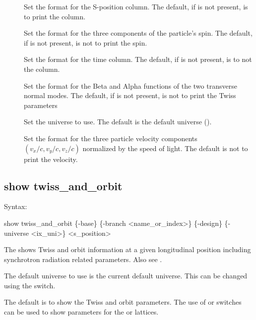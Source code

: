 {{{{{{{{{\begin{description}
%
\item[] \Newline
Set the format for the S-position column. The default, if  is not present, is to print the column.
%
\item[] \Newline
Set the format for the three components of the particle's spin. The default, if
 is not present, is not to print the spin.
%
\item[] \Newline
Set the format for the time column. The default, if  is not present, is to not the column.
%
\item[] \Newline
Set the format for the Beta and Alpha functions of the two transverse normal modes. The default, if
 is not present, is not to print the Twiss parameters
%
\item[] \Newline
Set the universe to use. The default is the default universe ().
%
\item[] \Newline
Set the format for the three particle velocity components $(v_x/c, v_y/c, v_z/c)$ normalized by the
speed of light. The default is not to print the velocity.
%
\end{description}


\subsection{show twiss_and_orbit}
\label{s:show.twiss}

Syntax:
\begin{example}
    show twiss_and_orbit \{-base\} \{-branch <name_or_index>\} \{-design\}
    \{-universe <ix_uni>\} <s_position>
\end{example}

The  shows Twiss and orbit information at a given longitudinal position
 including synchrotron radiation related parameters. Also see .

The default universe to use is the current default universe. This can be changed using the
 switch.

The default is to show the  Twiss and orbit parameters. The use of  or
 switches can be used to show parameters for the  or 
lattices.

}}}}}}}}}

